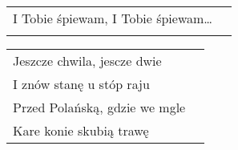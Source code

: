 \documentclass[a5paper]{article}
\begin{document}
\noindent
\begin{tabular}{@{}p{7.00cm}p{3cm}@{}}
I Tobie śpiewam, I Tobie śpiewam… \\ \\
\end{tabular}

\noindent
\begin{tabular}{@{}p{7.00cm}p{3cm}@{}}
Jeszcze chwila, jescze dwie \\
I znów stanę u stóp raju \\
Przed Polańską, gdzie we mgle \\
Kare konie skubią trawę
\end{tabular}
\end{document}
